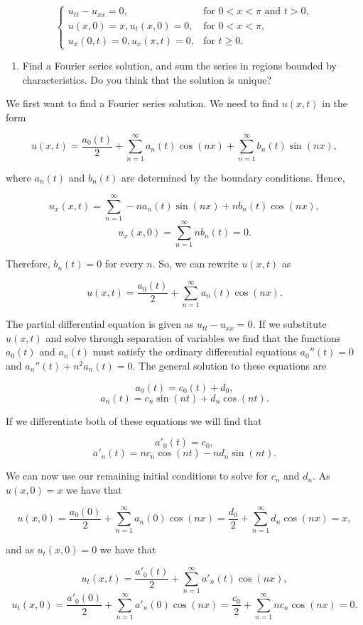 \documentclass{article}
\begin{document}
\[
  \begin{cases}
  u_{tt}-u_{xx}=0,  &\text{for $0<x<\pi$ and $t>0$}, \\
  u(x,0)=x, u_t(x,0)=0, & \text{for $0<x<\pi$}, \\
  u_x(0,t)=0, u_x(\pi,t)=0, & \text{for $t\geq0$}.
  \end{cases}
\]

\begin{enumerate}[label=(\alph*)]
    \item Find a Fourier series solution, and sum the series in regions bounded by characteristics. Do you think that the solution is unique?
\end{enumerate}

We first want to find a Fourier series solution. We need to find $u(x,t)$ in the form

$$u(x,t)=\frac{a_0(t)}{2}+\sum_{n=1}^{\infty}a_n(t)\cos(nx)+\sum_{n=1}^{\infty}b_n(t)\sin(nx),$$

where $a_n(t)$ and $b_n(t)$ are determined by the boundary conditions. Hence,

$$u_x(x,t)=\sum_{n=1}^{\infty}-na_n(t)\sin(nx)+n b_n(t)\cos(nx),$$
$$u_x(x,0)=\sum_{n=1}^{\infty}n b_n(t)=0.$$

Therefore, $b_n(t)=0$ for every $n$. So, we can rewrite $u(x,t)$ as

$$u(x,t)=\frac{a_0(t)}{2}+\sum_{n=1}^{\infty}a_n(t)\cos(nx).$$

The partial differential equation is given as $u_{tt}-u_{xx}=0$. If we substitute $u(x,t)$ and solve through separation of variables we find that the functions $a_0(t)$ and $a_n(t)$ must satisfy the ordinary differential equations $a_0''(t)=0$ and $a_n''(t)+n^2a_n(t)=0$. The general solution to these equations are

$$a_0(t)=c_0(t)+d_0,$$
$$a_n(t)=c_n\sin(nt)+d_n\cos(nt).$$

If we differentiate both of these equations we will find that

$${a'_0}(t)=c_0,$$
$${a'_n}(t)=nc_n\cos(nt)-n d_n\sin(nt).$$

We can now use our remaining initial conditions to solve for $c_n$ and $d_n$. As $u(x,0)=x$ we have that

$$u(x,0)=\frac{a_0(0)}{2}+\sum_{n=1}^{\infty}a_n(0)\cos(nx)=\frac{d_0}{2}+\sum_{n=1}^{\infty}d_n\cos(nx)=x,$$

and as $u_t(x,0)=0$ we have that

$$u_t(x,t)=\frac{{a'_0}(t)}{2} + \sum_{n=1}^{\infty}{a'_n}(t)\cos(nx),$$
$$u_t(x,0)=\frac{{a'_0}(0)}{2} + \sum_{n=1}^{\infty}a'_n(0)\cos(nx)=\frac{c_0}{2}+\sum_{n=1}^{\infty}nc_n\cos(nx)=0.$$
\end{document}

